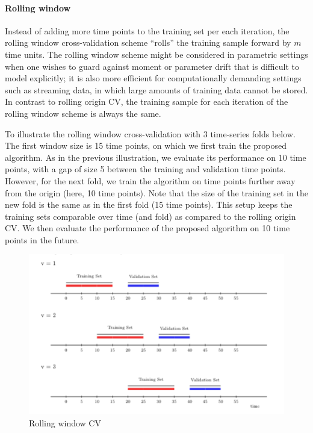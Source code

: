 \documentclass[12pt, krantz2,]{krantz}
\newenvironment{Shaded}{\begin{snugshade}}{\end{snugshade}}
\newcommand{\DecValTok}[1]{\textcolor[rgb]{0.06,0.06,0.06}{#1}}
\newcommand{\KeywordTok}[1]{\textcolor[rgb]{0.27,0.27,0.27}{\textbf{#1}}}
\newcommand{\NormalTok}[1]{#1}
\newcommand{\OperatorTok}[1]{\textcolor[rgb]{0.43,0.43,0.43}{\textbf{#1}}}
\newcommand{\StringTok}[1]{\textcolor[rgb]{0.5,0.5,0.5}{#1}}
\let\oldparagraph\paragraph
\renewcommand{\paragraph}[1]{\oldparagraph{#1}\mbox{}}
\theoremstyle{definition}
\theoremstyle{definition}
\theoremstyle{definition}
\newcommand{\1}{\mathbbm{1}}
\begin{document}
\begin{Shaded}
\end{Shaded}

\hypertarget{rolling-window}{%
\paragraph{Rolling window}\label{rolling-window}}

Instead of adding more time points to the training set per each iteration, the
rolling window cross-validation scheme ``rolls'' the training sample forward by
\(m\) time units. The rolling window scheme might be considered in parametric
settings when one wishes to guard against moment or parameter drift that is
difficult to model explicitly; it is also more efficient for computationally
demanding settings such as streaming data, in which large amounts of training
data cannot be stored. In contrast to rolling origin CV, the training sample for
each iteration of the rolling window scheme is always the same.

To illustrate the rolling window cross-validation with 3 time-series folds
below. The first window size is 15 time points, on which we first train the
proposed algorithm. As in the previous illustration, we evaluate its performance
on 10 time points, with a gap of size 5 between the training and validation time
points. However, for the next fold, we train the algorithm on time points
further away from the origin (here, 10 time points). Note that the size of the
training set in the new fold is the same as in the first fold (15 time points).
This setup keeps the training sets comparable over time (and fold) as compared
to the rolling origin CV. We then evaluate the performance of the proposed
algorithm on 10 time points in the future.

\begin{figure}

{\centering \includegraphics[width=0.8\linewidth]{img/image/rolling_window} 

}

\caption{Rolling window CV}\label{fig:unnamed-chunk-2}
\end{figure}
\end{document}
